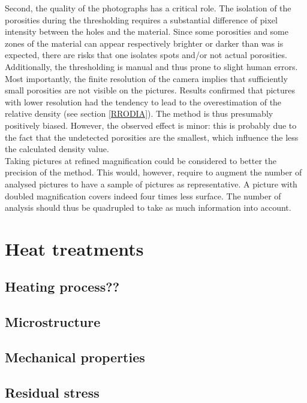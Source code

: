 Second, the quality of the photographs has a critical role. The isolation of the porosities during the thresholding requires a substantial difference of pixel intensity between the holes and the material. Since some porosities and some zones of the material can appear respectively brighter or darker than was is expected, there are risks that one isolates spots and/or not actual porosities. Additionally, the thresholding is manual and thus prone to slight human errors. \\

Most importantly, the finite resolution of the camera implies that sufficiently small porosities are not visible on the pictures. Results confirmed that pictures with lower resolution had the tendency to lead to the overestimation of the relative density (see section \ref{RRODIA}). The method is thus presumably positively biased. However, the observed effect is minor: this is probably due to the fact that the undetected porosities are the smallest, which influence the less the calculated density value.\\

Taking pictures at refined magnification could be considered to better the precision of the method. This would, however, require to augment the number of analysed pictures to have a sample of pictures as representative. A picture with doubled magnification covers indeed four times less surface. The number of analysis should thus be quadrupled to take as much information into account.\\


\section{Heat treatments}

\subsection{Heating process??}

\subsection{Microstructure}

\subsection{Mechanical properties}

\subsection{Residual stress}

